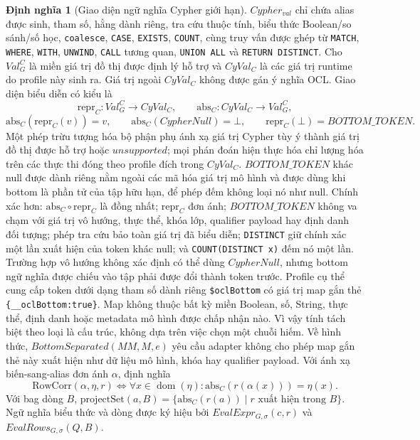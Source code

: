 \documentclass[11pt,a4paper]{article}
\theoremstyle{definition}
\newtheorem{definition}{Định nghĩa}
\newcommand{\RowCorr}{\mathrm{RowCorr}}
\newcommand{\projectSet}{\mathrm{projectSet}}
\newcommand{\reprC}{\mathrm{repr}_{C}}
\newcommand{\absC}{\mathrm{abs}_{C}}
\begin{document}
\begin{definition}[Giao diện ngữ nghĩa Cypher giới hạn]
$Cypher_{val}$ chỉ chứa alias được sinh, tham số, hằng dành riêng, tra cứu thuộc
tính, biểu thức Boolean/so sánh/số học, \texttt{coalesce}, \texttt{CASE},
\texttt{EXISTS}, \texttt{COUNT}, cùng truy vấn được ghép từ \texttt{MATCH},
\texttt{WHERE}, \texttt{WITH}, \texttt{UNWIND}, \texttt{CALL} tương quan,
\texttt{UNION ALL} và \texttt{RETURN DISTINCT}. Cho $Val_G^C$ là miền giá trị
đồ thị được định lý hỗ trợ và $CyVal_C$ là các giá trị runtime do profile này
sinh ra. Giá trị ngoài $CyVal_C$ không được gán ý nghĩa OCL. Giao diện biểu diễn
có kiểu là
\[
\reprC:Val_G^C\to CyVal_C,\qquad
\absC:CyVal_C\to Val_G^C,
\]
\[
\absC(\reprC(v))=v,\qquad
\absC(CypherNull)=\bot,\qquad
\reprC(\bot)=BOTTOM\_TOKEN.
\]
Một phép trừu tượng hóa bộ phận phụ ánh xạ giá trị Cypher tùy ý thành giá trị đồ
thị được hỗ trợ hoặc $unsupported$; mọi phán đoán hiện thực hóa chỉ lượng hóa
trên các thực thi đóng theo profile đích trong $CyVal_C$. $BOTTOM\_TOKEN$ khác
null được dành riêng nằm ngoài các mã hóa giá trị mô hình và được dùng khi
bottom là phần tử của tập hữu hạn, để phép đếm không loại nó như null. Chính
xác hơn: $\absC\circ\reprC$ là đồng nhất; $\reprC$ đơn ánh;
$BOTTOM\_TOKEN$ không va chạm với giá trị vô hướng, thực thể, khóa lớp,
qualifier payload hay định danh đối tượng; phép tra cứu bảo toàn giá trị đã biểu
diễn; \texttt{DISTINCT} giữ chính xác một lần xuất hiện của token khác null; và
\texttt{COUNT(DISTINCT x)} đếm nó một lần. Trường hợp vô hướng không xác định
có thể dùng $CypherNull$, nhưng bottom ngữ nghĩa được chiếu vào tập phải được
đổi thành token trước. Profile cụ thể cung cấp token dưới dạng tham số dành
riêng \texttt{\$oclBottom} có giá trị map gắn thẻ
\texttt{\{\_\_oclBottom:true\}}. Map không thuộc bất kỳ miền Boolean, số,
String, thực thể, định danh hoặc metadata mô hình được chấp nhận nào. Vì vậy
tính tách biệt theo loại là cấu trúc, không dựa trên việc chọn một chuỗi hiếm.
Về hình thức, $BottomSeparated(MM,M,e)$ yêu cầu adapter không cho phép map gắn
thẻ này xuất hiện như dữ liệu mô hình, khóa hay qualifier payload. Với ánh xạ biến-sang-alias
đơn ánh $\alpha$, định nghĩa
\[
\RowCorr(\alpha,\eta,r)\iff
\forall x\in\operatorname{dom}(\eta):\absC(r(\alpha(x)))=\eta(x).
\]
Với bag dòng $B$,
$\projectSet(a,B)=\{\absC(r(a))\mid r\text{ xuất hiện trong }B\}$.
Ngữ nghĩa biểu thức và dòng được ký hiệu bởi
$EvalExpr_{G,\sigma}(c,r)$ và $EvalRows_{G,\sigma}(Q,B)$.
\end{definition}
\end{document}
